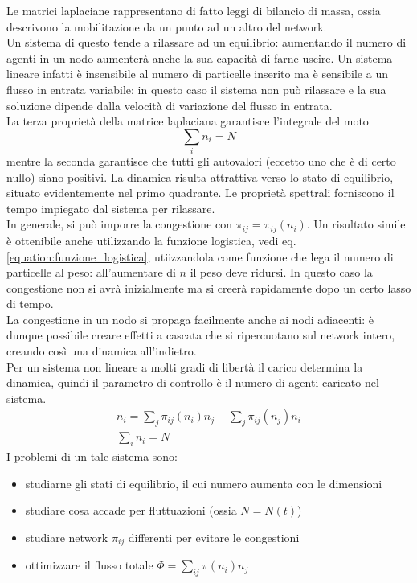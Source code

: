 \documentclass[12pt, a4paper]{book}
\theoremstyle{theorem}
\begin{document}
				Le matrici laplaciane rappresentano di fatto leggi di bilancio di massa, ossia descrivono la mobilitazione da un punto ad un altro del network.\\
				Un sistema di questo tende a rilassare ad un equilibrio: aumentando il numero di agenti in un nodo aumenterà anche la sua capacità di farne uscire.
				Un sistema lineare infatti è insensibile al numero di particelle inserito ma è sensibile a un flusso in entrata variabile: in questo caso il sistema non può rilassare e la sua soluzione dipende dalla velocità di variazione del flusso in entrata.\\
				La terza proprietà della matrice laplaciana garantisce l'integrale del moto
				\begin{equation*}
					\sum_in_i=N
				\end{equation*}
				mentre la seconda garantisce che tutti gli autovalori (eccetto uno che è di certo nullo) siano positivi.
				La dinamica risulta attrattiva verso lo stato di equilibrio, situato evidentemente nel primo quadrante.
				Le proprietà spettrali forniscono il tempo impiegato dal sistema per rilassare.\\
				In generale, si può imporre la congestione con $\pi_{ij}=\pi_{ij}(n_i)$.
				Un risultato simile è ottenibile anche utilizzando la funzione logistica, vedi eq. \ref{equation:funzione_logistica}, utiizzandola come funzione che lega il numero di particelle al peso: all'aumentare di $n$ il peso deve ridursi.
				In questo caso la congestione non si avrà inizialmente ma si creerà rapidamente dopo un certo lasso di tempo.\\
				La congestione in un nodo si propaga facilmente anche ai nodi adiacenti: è dunque possibile creare effetti a cascata che si ripercuotano sul network intero, creando così una dinamica all'indietro.\\
				Per un sistema non lineare a molti gradi di libertà il carico determina la dinamica, quindi il parametro di controllo è il numero di agenti caricato nel sistema.
				\begin{equation*}
					\begin{split}
						\dot{n}_i=\sum_j\pi_{ij}(n_i)n_j-\sum_j\pi_{ij}(n_j)n_i\\
						\sum_in_i=N
					\end{split}
				\end{equation*}
				I problemi di un tale sistema sono:
				\begin{itemize}
					\item studiarne gli stati di equilibrio, il cui numero aumenta con le dimensioni
					\item studiare cosa accade per fluttuazioni (ossia $N=N(t)$)
					\item studiare network $\pi_{ij}$ differenti per evitare le congestioni
					\item ottimizzare il flusso totale $\Phi=\sum_{ij}\pi(n_{i})n_j$
				\end{itemize}
\end{document}
